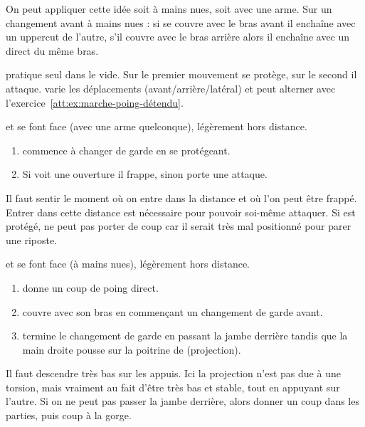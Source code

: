 On peut appliquer cette idée soit à mains nues, soit avec une arme.
Sur un changement avant à mains nues : si \A se couvre avec le bras avant il enchaîne avec un uppercut de l'autre, s'il couvre avec le bras arrière alors il enchaîne avec un direct du même bras.


\begin{exercice}
	\label{att:ex:changement-garde-2-temps-vide}
	
	\A pratique seul dans le vide.
	Sur le premier mouvement \A se protège, sur le second il attaque.
	\A varie les déplacements (avant/arrière/latéral) et peut alterner avec l'exercice~\ref{att:ex:marche-poing-détendu}.
\end{exercice}


\begin{exercice}
	\label{att:ex:changement-garde-2-temps-test}

	\A et \D se font face (avec une arme quelconque), légèrement hors distance.

	\begin{enumerate}
		\item \A commence à changer de garde en se protégeant.
		
		\item Si \D voit une ouverture il frappe, sinon \A porte une attaque.
	\end{enumerate}

	Il faut sentir le moment où on entre dans la distance et où l'on peut être frappé.
	Entrer dans cette distance est nécessaire pour pouvoir soi-même attaquer.
	Si \A est protégé, \D ne peut pas porter de coup car il serait très mal positionné pour parer une riposte.
\end{exercice}




\begin{exercice}
	\label{att:ex:changement-garde-2-temps-projection}


	\A et \D se font face (à mains nues), légèrement hors distance.

	\begin{enumerate}
		\item \A donne un coup de poing direct.
		
		\item \D couvre avec son bras en commençant un changement de garde avant.
		
		\item \D termine le changement de garde en passant la jambe derrière \D tandis que la main droite pousse sur la poitrine de \A (projection).
	\end{enumerate}

	Il faut descendre très bas sur les appuis.
	Ici la projection n'est pas due à une torsion, mais vraiment au fait d'être très bas et stable, tout en appuyant sur l'autre.
	Si on ne peut pas passer la jambe derrière, alors donner un coup dans les parties, puis coup à la gorge.
\end{exercice}


